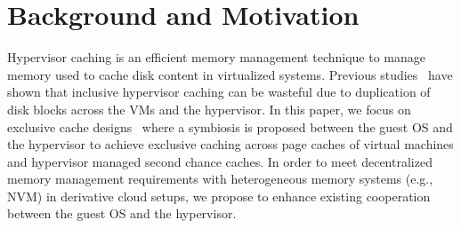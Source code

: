 \section{Background and Motivation}
\label{sec:bg}
%
Hypervisor caching is an efficient memory management technique 
to manage memory used to cache disk content  
in virtualized systems. 
%
%
Previous studies~\cite{kvmzcache,singleton} have shown that
inclusive hypervisor caching can be wasteful due to duplication of disk blocks 
across the VMs and the hypervisor. 
%
In this paper, we focus on exclusive cache designs~\cite{memtrans}
where a symbiosis is proposed
between the guest OS and the hypervisor to achieve exclusive caching
across page caches of virtual machines and hypervisor managed second 
chance caches.
%
In order to meet decentralized memory management 
requirements with heterogeneous memory systems (e.g., NVM) in derivative cloud
setups, we propose to enhance existing cooperation between the guest OS 
and the hypervisor. 
% 




